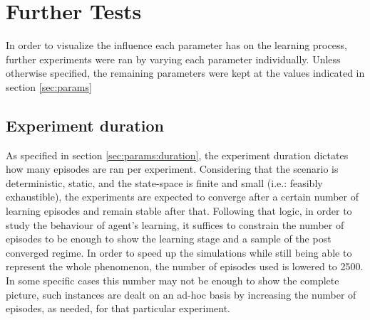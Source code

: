 \documentclass[10pt]{article}
\begin{document}
\section{Further Tests}\label{sec:further_tests}
    In order to visualize the influence each parameter has on the learning process, further experiments were ran by varying each parameter individually. Unless otherwise specified, the remaining parameters were kept at the values indicated in section \ref{sec:params}

    \subsection{Experiment duration}
        As specified in section \ref{sec:params:duration}, the experiment duration dictates how many episodes are ran per experiment. Considering that the scenario is deterministic, static, and the state-space is finite and small (i.e.: feasibly exhaustible), the experiments are expected to converge after a certain number of learning episodes and remain stable after that. Following that logic, in order to study the behaviour of agent's learning, it suffices to constrain the number of episodes to be enough to show the learning stage and a sample of the post converged regime. In order to speed up the simulations while still being able to represent the whole phenomenon, the number of episodes used is lowered to 2500. In some specific cases this number may not be enough to show the complete picture, such instances are dealt on an ad-hoc basis by increasing the number of episodes, as needed, for that particular experiment.
\end{document}
